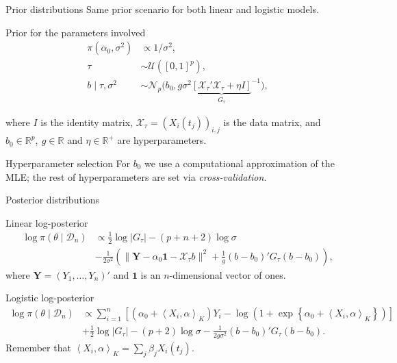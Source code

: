 \documentclass[9pt, english, professionalfonts]{beamer}
\newcommand{\R} {\ensuremath{\mathds{R}}}
\newcommand{\D} {\ensuremath{\mathcal{D}}}
\newcommand{\X} {\ensuremath{\mathcal{X}}}
\newcommand{\U} {\ensuremath{\mathcal{U}}}
\newcommand\dotprod[2]{\left\langle #1, #2 \right\rangle}
\begin{document}
\begin{frame}{Prior distributions}
  Same prior scenario for both linear and logistic models.
  \vspace{.5em}
  \begin{block}{Prior for the parameters involved}
    \vspace{-1em}
  \begin{align*}
  \pi(\alpha_0, \sigma^2)              & \propto 1/\sigma^2,                                                     \\
  \tau                     & \sim \U([0, 1]^p),                                              \\
  b\mid \tau, \sigma^2 & \sim \mathcal N_p\big(b_0, g\sigma^2{\underbrace{\left[\X_\tau' \X_\tau + \eta I\right]}_{G_\tau}}^{-1}\big),
\end{align*}

\vspace{-1em}
where \(I\) is the identity matrix, \(\X_\tau = (X_i(t_j))_{i,j}\) is the data matrix, and \(b_0\in \R^p, \ g \in \R\) and \(\eta \in \R^+\) are hyperparameters.
\end{block}


\vspace{1em}
\begin{alertblock}{Hyperparameter selection}
  \vspace{0.25em}
  For \(b_0\) we use a computational approximation of the MLE; the rest of hyperparameters are set via \textit{cross-validation}.
\end{alertblock}
\end{frame}

\begin{frame}{Posterior distributions}
  \begin{block}{Linear log-posterior}
    \vspace{-1em}
    \begin{align*}
  \log \pi(\theta\mid \D_n) & \propto \frac{1}{2}\log |G_\tau| - (p+n+2)\log \sigma\\
  &-\frac{1}{2\sigma^2} \left(\|\bm{Y}-\alpha_0\bm{1} - \X_\tau b\|^2 + \frac{1}{g}(b - b_0)'G_\tau(b - b_0) \right),
\end{align*}
where \(\bm Y=(Y_1,\dots,Y_n)'\) and \(\bm{1}\) is an \(n\)-dimensional vector of ones.
  \end{block}
  \vspace{1em}
  \begin{block}{Logistic log-posterior}
      \vspace{-1em}
    \begin{align*}
  \log \pi(\theta \mid \D_n) & \propto \sum_{i=1}^n \left[ \left(\alpha_0 + \dotprod{X_i}{\alpha}_K\right)Y_i - \log\left(1 + \exp\left\{\alpha_0 + \dotprod{X_i}{\alpha}_K\right\}\right)\right]\\
  \quad &+ \frac{1}{2}\log |G_\tau| - (p+2)\log \sigma -\frac{1}{2g\sigma^2} (b - b_0)'G_\tau(b - b_0).
\end{align*}
Remember that \(\dotprod{X_i}{\alpha}_K = \sum_j \beta_j X_i(t_j)\).
  \end{block}
\end{frame}
\end{document}
